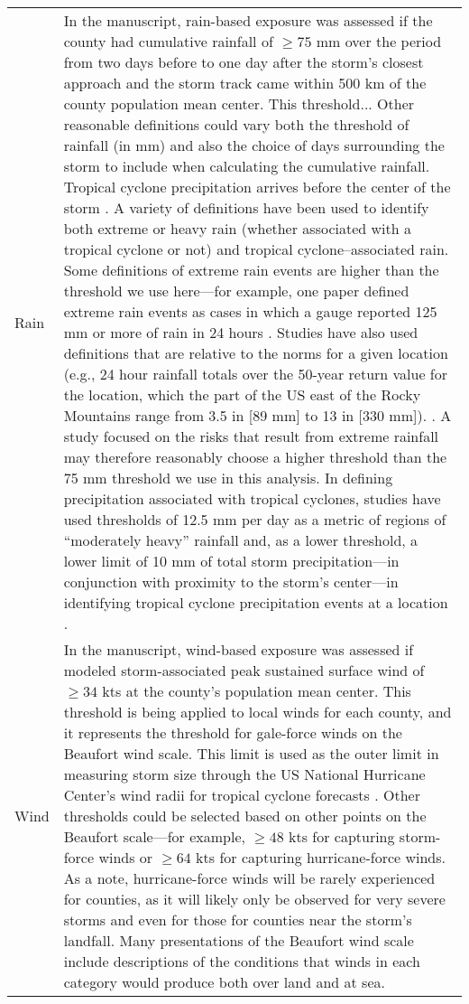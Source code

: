 \begin{longtable}{lp{40em}}
Rain & In the manuscript, rain-based exposure was assessed if the county had cumulative rainfall of $\ge75$ mm over the period from two days before to one day after the storm’s closest approach and the storm track came within 500 km of the county population mean center. This threshold... Other reasonable definitions could vary both the threshold of rainfall (in mm) and also the choice of days surrounding the storm to include when calculating the cumulative rainfall. Tropical cyclone precipitation arrives before the center of the storm \parencite{zhou2017spatial}. A variety of definitions have been used to identify both extreme or heavy rain (whether associated with a tropical cyclone or not) and tropical cyclone--associated rain. Some definitions of extreme rain events are higher than the threshold we use here---for example, one paper defined extreme rain events as cases in which a gauge reported 125 mm or more of rain in 24 hours \parencite{schumacher2006characteristics}. Studies have also used definitions that are relative to the norms for a given location (e.g., 24 hour rainfall totals over the 50-year return value for the location, which the part of the US east of the Rocky Mountains range from 3.5 in [89 mm] to 13 in [330 mm]). \parencite{schumacher2006characteristics, schumacher2005organization, stevenson201410}. A study focused on the risks that result from extreme rainfall may therefore reasonably choose a higher threshold than the 75 mm threshold we use in this analysis. In defining precipitation associated with tropical cyclones, studies have used thresholds of 12.5 mm per day as a metric of regions of ``moderately heavy'' rainfall \parencite{zhou2017spatial} and, as a lower threshold, a lower limit of 10 mm of total storm precipitation---in conjunction with proximity to the storm's center---in identifying tropical cyclone precipitation events at a location \parencite{feldmann2019estimation}. \\
Wind & In the manuscript, wind-based exposure was assessed if modeled storm-associated peak sustained surface wind of $\ge34$ kts at the county’s population mean center. This threshold is being applied to local winds for each county, and it represents the threshold for gale-force winds on the Beaufort wind scale. This limit is used as the outer limit in measuring storm size through the US National Hurricane Center's wind radii for tropical cyclone forecasts \parencite{cangialosi2016examination}. Other thresholds could be selected based on other points on the Beaufort scale---for example, $\ge48$ kts for capturing storm-force winds or $\ge64$ kts for capturing hurricane-force winds. As a note, hurricane-force winds will be rarely experienced for counties, as it will likely only be observed for very severe storms and even for those for counties near the storm's landfall. Many presentations of the Beaufort wind scale include descriptions of the conditions that winds in each category would produce both over land and at sea.\\
\hline
\end{longtable}